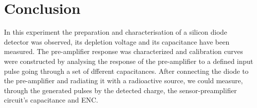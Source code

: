 \documentclass[12pt]{article}
\begin{document}
\section{Conclusion}

In this experiment the preparation and characterisation of a silicon diode detector was observed, its depletion voltage and its capacitance have been measured. The pre-amplifier response was characterized and calibration curves were constructed by analysing the response of the pre-amplifier to a defined input pulse going through a set of dfferent capacitances. After connecting the diode to the pre-amplifier and radiating it with a radioactive source, we could measure, through the generated pulses by the detected charge, the sensor-preamplifier circuit's capacitance and ENC.
\end{document}
